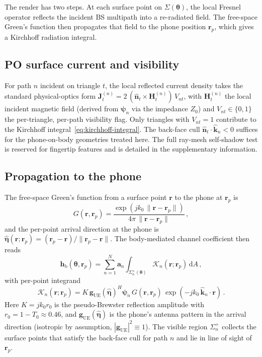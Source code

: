 \documentclass[journal,twocolumn,10pt]{IEEEtran}
\theoremstyle{plain}
\theoremstyle{definition}
\theoremstyle{remark}
\newcommand{\khat}{\hat{\bm{k}}}
\newcommand{\nhat}{\hat{\bm{n}}}
\newcommand{\etahat}{\hat{\bm{\eta}}}
\newcommand{\rr}{\mathbf{r}}
\newcommand{\HH}{\mathbf{H}}
\newcommand{\psin}{\bm{\psi}_n}
\newcommand{\thetab}{\bm{\theta}}
\newcommand{\hbody}{\bm{h}_{\mathrm{b}}}
\newcommand{\Tepskin}{T_{0}}
\begin{document}

The render has two steps. At each surface point on
$\Sigma(\thetab)$, the local Fresnel operator reflects the incident
BS multipath into a re-radiated field. The free-space Green's
function then propagates that field to the phone position $\rr_p$,
which gives a Kirchhoff radiation integral.

\subsection{PO surface current and visibility}

For path $n$ incident on triangle $t$, the local reflected current
density takes the standard physical-optics form $\bm{J}^{(n)}_t =
2\,(\nhat_t \times \HH^{(n)}_t)\,V_{nt}$, with $\HH^{(n)}_t$ the
local incident magnetic field (derived from $\psin$ via the
impedance $Z_0$) and $V_{nt} \in \{0,1\}$ the per-triangle, per-path
visibility flag. Only triangles with $V_{nt}=1$ contribute to the
Kirchhoff integral~\eqref{eq:kirchhoff-integral}. The back-face
cull $\nhat_t \cdot \khat_n < 0$ suffices for the phone-on-body
geometries treated here. The full ray-mesh self-shadow test is
reserved for fingertip features and is detailed in the
supplementary information.

\subsection{Propagation to the phone}

The free-space Green's function from a surface point $\rr$ to the
phone at $\rr_p$ is
\begin{equation}
G(\rr,\rr_p) = \frac{\exp(jk_0\,\|\rr-\rr_p\|)}{4\pi\,\|\rr-\rr_p\|} \,,
\end{equation}
and the per-point arrival direction at the phone is
$\etahat(\rr;\rr_p) = (\rr_p - \rr)/\|\rr_p - \rr\|$. The
body-mediated channel coefficient then reads
\begin{equation}\label{eq:kirchhoff-integral}
\hbody(\thetab,\rr_p) = \sum_{n=1}^{N} \bm{a}_n
\int_{\Sigma_n^{+}(\thetab)} \mathcal{K}_n(\rr;\rr_p)\,\mathrm{d}A \,,
\end{equation}
with per-point integrand
\begin{equation}\label{eq:kernel}
\mathcal{K}_n(\rr;\rr_p) = K\,\bm{g}_{\mathrm{UE}}(\etahat)^{H}\psin
\,G(\rr,\rr_p)\,\exp(-jk_0\,\khat_n\cdot\rr) \,.
\end{equation}
Here $K = jk_0 r_0$ is the pseudo-Brewster reflection amplitude with
$r_0 = 1 - \Tepskin \approx 0.46$, and $\bm{g}_{\mathrm{UE}}(\etahat)$
is the phone's antenna pattern in the arrival direction (isotropic
by assumption, $|\bm{g}_{\mathrm{UE}}|^2 \equiv 1$). The visible
region $\Sigma_n^{+}$ collects the surface points that satisfy the
back-face cull for path $n$ and lie in line of sight of $\rr_p$.
\end{document}
